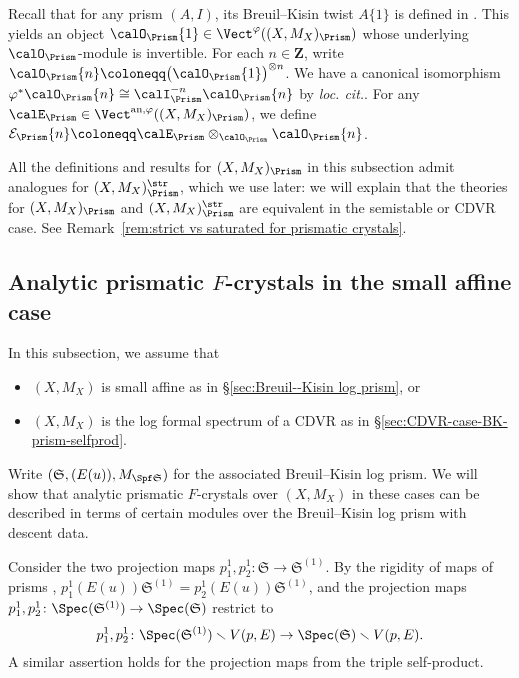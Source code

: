 Recall that for any prism $(A, I)$, its Breuil--Kisin twist $A\{1\}$ is defined in \cite[\S2.3, 2.5]{Bhatt-Lurie-absoluteprismticcohomology}. This yields an object $\calO_{\Prism}\{1\} \in \Vect^{\varphi}((X,M_X)_\Prism)$ whose underlying $\calO_\Prism$-module is invertible. For each $n \in \mathbf{Z}$, write $\calO_\Prism\{n\}\coloneqq  \bigl(\calO_\Prism\{1\}\bigr)^{\otimes n}$. We have a canonical isomorphism $\varphi^\ast\calO_\Prism\{n\}\cong \calI_\Prism^{-n}\calO_\Prism\{n\}$ by \textit{loc. cit.}. For any $\calE_\Prism \in \Vect^{\mathrm{an},\varphi}((X,M_X)_\Prism)$, we define $\mathcal{E}_{\Prism}\{n\} \coloneqq \calE_\Prism\otimes_{\calO_\Prism} \calO_{\Prism}\{n\}$. 

\begin{rem}\label{rem:corresponding notions for strict site}
All the definitions and results for $(X,M_X)_\Prism$ in this subsection admit analogues for $(X,M_X)_\Prism^\str$, which we use later: we will explain that the theories for $(X,M_X)_\Prism$ and $(X,M_X)_\Prism^\str$ are equivalent in the semistable or CDVR case. See Remark~\ref{rem:strict vs saturated for prismatic crystals}.
\end{rem}

\subsection{Analytic prismatic \texorpdfstring{$F$}{F}-crystals in the small affine case}\label{sec:analytic prismatic F-crystal in small affine case}
In this subsection, we assume that 
\begin{itemize}
    \item $(X, M_X)$ is small affine as in \S\ref{sec:Breuil--Kisin log prism}, or
    \item $(X, M_X)$ is the log formal spectrum of a CDVR as in \S\ref{sec:CDVR-case-BK-prism-selfprod}.
\end{itemize}
Write $(\mathfrak{S}, (E(u)), M_{\Spf \mathfrak{S}})$ for the associated Breuil--Kisin log prism. We will show that analytic prismatic $F$-crystals over $(X, M_X)$ in these cases can be described in terms of certain modules over the Breuil--Kisin log prism with descent data. 

Consider the two projection maps $p^1_1, p^1_2\colon \mathfrak{S} \rightarrow \mathfrak{S}^{(1)}$. By the rigidity of maps of prisms \cite[Lem.~3.5]{bhatt-scholze-prismaticcohom},  $p^1_1(E(u))\mathfrak{S}^{(1)} = p^1_2(E(u))\mathfrak{S}^{(1)}$, and the projection maps 
$p^1_1, p^1_2\colon \Spec (\mathfrak{S}^{(1)}) \rightarrow \Spec (\mathfrak{S})$
restrict to
\[
p^1_1, p^1_2\colon \Spec (\mathfrak{S}^{(1)})\smallsetminus V(p,E) \rightarrow \Spec (\mathfrak{S})\smallsetminus V(p,E).
\]
A similar assertion holds for the projection maps from the triple self-product.

